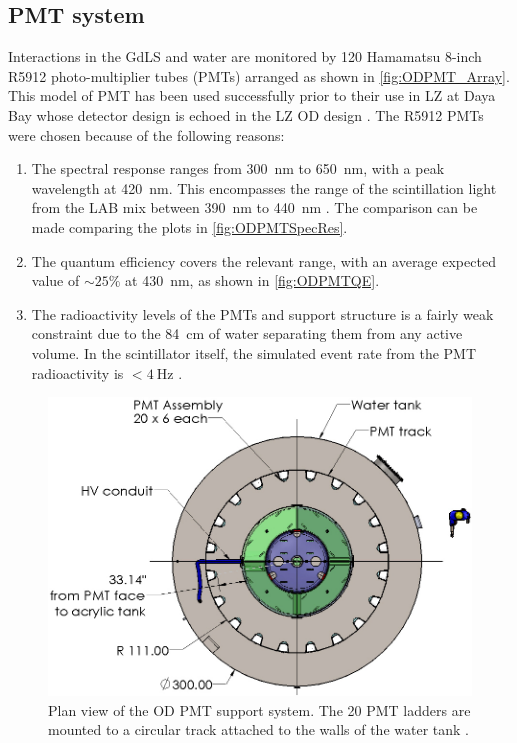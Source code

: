 \subsection{PMT system}
Interactions in the GdLS and water are monitored by 120 Hamamatsu 8-inch R5912 photo-multiplier tubes (PMTs) arranged as shown in \autoref{fig:ODPMT_Array}. 
This model of PMT has been used successfully prior to their use in LZ at Daya Bay whose detector design is echoed in the LZ OD design \cite{Cao:2016vwh}. The R5912 PMTs were chosen because of the following reasons:
\begin{enumerate} 
    \item The spectral response ranges from 300~nm to 650~nm, with a peak wavelength at 420~nm. This encompasses the range of the scintillation light from the LAB mix between 390~nm to 440~nm \cite{Haselschwardt:2018vmp}. The comparison can be made comparing the plots in \autoref{fig:ODPMTSpecRes}.
    \item The quantum efficiency covers the relevant range, with an average expected value of $\sim25\%$ at 430~nm, as shown in \autoref{fig:ODPMTQE}.
    \item The radioactivity levels of the PMTs and support structure is a fairly weak constraint due to the 84~cm of water separating them from any active volume. In the scintillator itself, the simulated event rate from the PMT radioactivity is $<4~\text{Hz}$ \cite{LZTDR}. 
\end{enumerate}
\begin{figure}[ht!]
    \centering
    \includegraphics[width=0.6\linewidth]{figures/LZ/OD_PMT_support.jpg}
    \caption{Plan view of the OD PMT support system. The 20 PMT ladders are mounted to a circular track attached to the walls of the water tank \cite{LZTDR}.}
    \label{fig:ODPMT_Array}
\end{figure}
